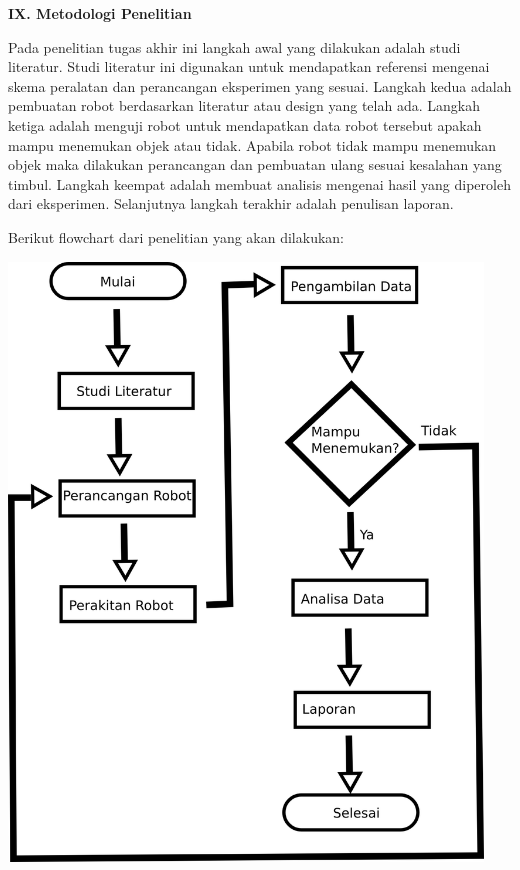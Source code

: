 \documentclass[a4paper,12pt]{article}
\begin{document}
\newpage
\noindent \textbf{IX. \hspace{9pt} Metodologi Penelitian}

Pada penelitian tugas akhir ini langkah awal yang dilakukan adalah studi literatur.
Studi literatur ini digunakan untuk mendapatkan referensi mengenai skema peralatan dan perancangan eksperimen yang sesuai.
Langkah kedua adalah pembuatan robot berdasarkan literatur atau design yang telah ada.
Langkah ketiga adalah menguji robot untuk mendapatkan data robot tersebut apakah mampu menemukan objek atau tidak.
Apabila robot tidak mampu menemukan objek maka dilakukan perancangan dan pembuatan ulang sesuai kesalahan yang timbul.
Langkah keempat adalah membuat analisis mengenai hasil yang diperoleh dari eksperimen. 
Selanjutnya langkah terakhir adalah penulisan laporan.

Berikut flowchart dari penelitian yang akan dilakukan:

\begin{center}
 \includegraphics[height=450pt]{work}
\end{center}

\newpage
\end{document}
